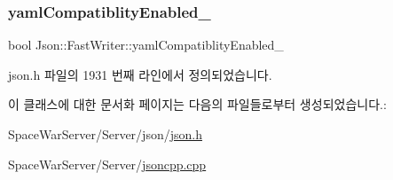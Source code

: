 \subsubsection{\texorpdfstring{yaml\+Compatiblity\+Enabled\+\_\+}{yamlCompatiblityEnabled\_}}
{\footnotesize\ttfamily bool Json\+::\+Fast\+Writer\+::yaml\+Compatiblity\+Enabled\+\_\+\hspace{0.3cm}{\ttfamily [private]}}



json.\+h 파일의 1931 번째 라인에서 정의되었습니다.



이 클래스에 대한 문서화 페이지는 다음의 파일들로부터 생성되었습니다.\+:\begin{DoxyCompactItemize}
\item 
Space\+War\+Server/\+Server/json/\hyperlink{json_8h}{json.\+h}\item 
Space\+War\+Server/\+Server/\hyperlink{jsoncpp_8cpp}{jsoncpp.\+cpp}\end{DoxyCompactItemize}
